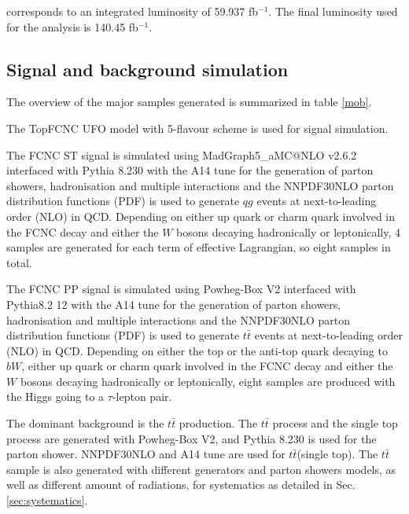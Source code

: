 corresponds to an integrated luminosity of 59.937 fb$^{-1}$. The final luminosity used for the analysis is 140.45 fb$^{-1}$.

\subsection{Signal and background simulation}
\label{sec:generator}

The overview of the major samples generated is summarized in table \ref{mob}.

The TopFCNC UFO model \cite{FCNC_UFO1,FCNC_UFO2} with 5-flavour scheme is used for signal simulation.

The FCNC ST signal is simulated using MadGraph5\_aMC@NLO v2.6.2 \cite{MG5} interfaced with Pythia 8.230 \cite{Pythia8} with the A14 tune \cite{A14} for the generation of parton showers, hadronisation and multiple interactions and the NNPDF30NLO \cite{NNPDF30NLO} parton distribution functions (PDF) is used to generate $qg$ events at next-to-leading order (NLO) in QCD. Depending on either up quark or charm quark involved in the FCNC decay and either the $W$ bosons decaying hadronically or leptonically, 4 samples are generated for each term of effective Lagrangian, so eight samples in total.

The FCNC PP signal is simulated using Powheg-Box \cite{Powheg} V2 interfaced with Pythia8.2 12 \cite{Pythia8} with the A14 tune \cite{A14} for the generation of parton showers, hadronisation and multiple interactions and the NNPDF30NLO \cite{NNPDF30NLO} parton distribution functions (PDF) is used to generate $t\bar{t}$ events at next-to-leading order (NLO) in QCD. Depending on either the top or the anti-top quark decaying to $bW$, either up quark or charm quark involved in the FCNC decay and either the $W$ bosons decaying hadronically or leptonically, eight samples are produced with the Higgs going to a $\tau$-lepton pair.

The dominant background is the $t\bar{t}$ production. The $t\bar{t}$ process and the single top process are generated with Powheg-Box \cite{Powheg} V2, and Pythia 8.230 is used for the parton shower. NNPDF30NLO \cite{NNPDF30NLO} and A14 tune \cite{A14} are used for $t\bar{t}$(single top). The $t\bar{t}$ sample is also generated with different generators and parton showers models, as well as different amount of radiations, for systematics as detailed in Sec. \ref{sec:systematics}.

